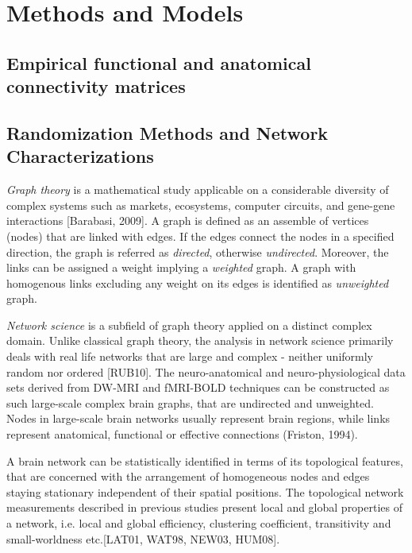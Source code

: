
\chapter{Methods and Models} %

\label{Chapter2} %



\section{Empirical functional and anatomical connectivity matrices}

\section{Randomization Methods and Network Characterizations}

\textit{Graph theory} is a mathematical study applicable on a considerable diversity of complex systems such as markets, ecosystems, computer circuits, and gene-gene interactions [Barabasi, 2009]. A graph is defined as an assemble of vertices (nodes) that are linked with edges. If the edges connect the nodes in a specified direction, the graph is referred as \textit{directed}, otherwise \textit{undirected}. Moreover, the links can be assigned a weight implying a \textit{weighted} graph. A graph with homogenous links excluding any weight on its edges is identified as \textit{unweighted} graph.

\textit{Network science} is a subfield of graph theory applied on a   
distinct complex domain. Unlike classical graph theory, the analysis in network science primarily deals with real life networks that are large and complex - neither uniformly random nor ordered [RUB10]. The neuro-anatomical and neuro-physiological data sets derived from  DW-MRI and fMRI-BOLD techniques can be constructed as such large-scale complex brain graphs, that are undirected and unweighted. Nodes in large-scale brain networks usually represent brain regions, while links represent anatomical, functional or effective connections (Friston, 1994). 


A brain network can be statistically identified in terms of its topological features, that are concerned with the arrangement of homogeneous nodes and edges staying stationary independent of their spatial positions. The topological network measurements described in previous studies present local and global properties of a network, i.e. local and global efficiency, clustering coefficient, transitivity and small-worldness etc.[LAT01, WAT98, NEW03, HUM08].


